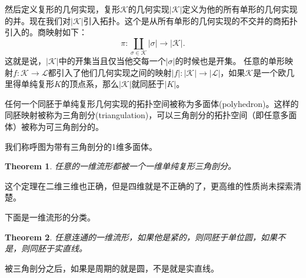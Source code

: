 \documentclass[10pt]{book}
\theoremstyle{plain}%
\newtheorem{theo}{Theorem}%
\begin{document}
然后定义复形的几何实现，复形$\mathcal{K}$的几何实现$|\mathcal{K}|$定义为他的所有单形的几何实现的并。现在我们对$|\mathcal{K}|$引入拓扑。这个是从所有单形的几何实现的不交并的商拓扑引入的。商映射如下：
\[\pi:\coprod_{\sigma\in\mathcal{K}}|\sigma|\to|\mathcal{K}|.\] 
这就是说，$|\mathcal{K}|$中的开集当且仅当他交每一个$|\sigma|$的时候也是开集。
任意的单形映射$f:\mathcal{K}\to \mathcal{L}$都引入了他们几何实现之间的映射$​|f|​:|\mathcal{K}|\to|\mathcal{L}|$，如果$\mathcal{K}$是一个欧几里得单纯复形$K$的顶点系，那么$|\mathcal{K}|$就同胚于$|K|$。

任何一个同胚于单纯复形几何实现的拓扑空间被称为多面体(polyhedron)。这样的同胚映射被称为三角剖分(triangulation)，可以三角剖分的拓扑空间（即任意多面体）被称为可三角剖分的。

我们称呼图为带有三角剖分的1维多面体。

\begin{theo}
任意的一维流形都被一个一维单纯复形三角剖分。
\end{theo}
这个定理在二维三维也正确，但是四维就是不正确的了，更高维的性质尚未探索清楚。

下面是一维流形的分类。

\begin{theo}
任意连通的一维流形，如果他是紧的，则同胚于单位圆，如果不是，则同胚于实直线。
\end{theo}
被三角剖分之后，如果是周期的就是圆，不是就是实直线。
\end{document}
